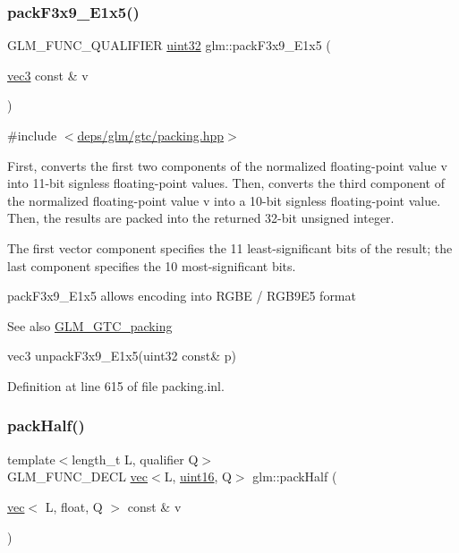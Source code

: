 \subsubsection{\texorpdfstring{pack\+F3x9\+\_\+\+E1x5()}{packF3x9\_E1x5()}}
{\footnotesize\ttfamily G\+L\+M\+\_\+\+F\+U\+N\+C\+\_\+\+Q\+U\+A\+L\+I\+F\+I\+ER \hyperlink{group__gtc__type__precision_ga202b6a53c105fcb7e531f9b443518451}{uint32} glm\+::pack\+F3x9\+\_\+\+E1x5 (\begin{DoxyParamCaption}\item[{\hyperlink{group__core__types_ga1c47e8b3386109bc992b6c48e91b0be7}{vec3} const \&}]{v }\end{DoxyParamCaption})}



{\ttfamily \#include $<$\hyperlink{gtc_2packing_8hpp}{deps/glm/gtc/packing.\+hpp}$>$}

First, converts the first two components of the normalized floating-\/point value v into 11-\/bit signless floating-\/point values. Then, converts the third component of the normalized floating-\/point value v into a 10-\/bit signless floating-\/point value. Then, the results are packed into the returned 32-\/bit unsigned integer.

The first vector component specifies the 11 least-\/significant bits of the result; the last component specifies the 10 most-\/significant bits.

pack\+F3x9\+\_\+\+E1x5 allows encoding into R\+G\+BE / R\+G\+B9\+E5 format

\begin{DoxySeeAlso}{See also}
\hyperlink{group__gtc__packing}{G\+L\+M\+\_\+\+G\+T\+C\+\_\+packing} 

vec3 unpack\+F3x9\+\_\+\+E1x5(uint32 const\& p) 
\end{DoxySeeAlso}


Definition at line 615 of file packing.\+inl.

\mbox{\label{group__gtc__packing_ga2d8bbce673ebc04831c1fb05c47f5251}} 
\subsubsection{\texorpdfstring{pack\+Half()}{packHalf()}}
{\footnotesize\ttfamily template$<$length\+\_\+t L, qualifier Q$>$ \\
G\+L\+M\+\_\+\+F\+U\+N\+C\+\_\+\+D\+E\+CL \hyperlink{structglm_1_1vec}{vec}$<$L, \hyperlink{group__gtc__type__precision_gad8c2939e1fdd8e5828b31d95c52255d5}{uint16}, Q$>$ glm\+::pack\+Half (\begin{DoxyParamCaption}\item[{\hyperlink{structglm_1_1vec}{vec}$<$ L, float, Q $>$ const \&}]{v }\end{DoxyParamCaption})}



